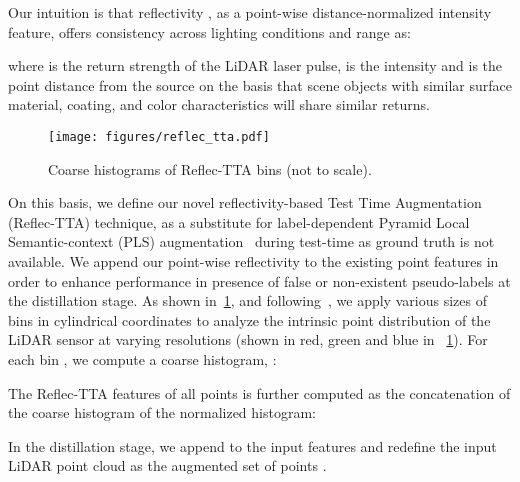 \documentclass[10pt,twocolumn,letterpaper]{article}
\begin{document}
Our intuition is that reflectivity , as a point-wise distance-normalized intensity feature, offers consistency across lighting conditions and range as:

where  is the return strength of the LiDAR laser pulse,  is the intensity and  is the point distance from the source on the basis that scene objects with similar surface material, coating, and color characteristics will share similar  returns.

\begin{figure}[thp]
    \centering
    \texttt{[image: figures/reflec\_tta.pdf]}
    \caption{Coarse histograms of Reflec-TTA bins (not to scale). }
    \label{fig:reflec_tta}
    \vspace{-5pt}
\end{figure}



On this basis, we define our novel reflectivity-based Test Time Augmentation (Reflec-TTA) technique, as a substitute for label-dependent Pyramid Local Semantic-context (PLS) augmentation~\cite{Unal_2022_CVPR} during test-time as ground truth is not available. We append our point-wise reflectivity to the existing point features in order to enhance performance in presence of false or non-existent pseudo-labels at the distillation stage. As shown in~\cref{fig:reflec_tta},  and following~\cite{Unal_2022_CVPR}, we apply various sizes  of bins in cylindrical coordinates to analyze the intrinsic point distribution of the LiDAR sensor at varying resolutions (shown in red, green and blue in ~\cref{fig:reflec_tta}). For each bin , we compute a coarse histogram, :

The Reflec-TTA features  of all points  is further computed as the concatenation of the coarse histogram  of the normalized histogram:

In the distillation stage, we append  to the input features and redefine the input LiDAR point cloud as the augmented set of points .




\subsection{\textbf{\textls[-2]{{\samplfull}}}}
\label{sec:MRFD}
\end{document}
